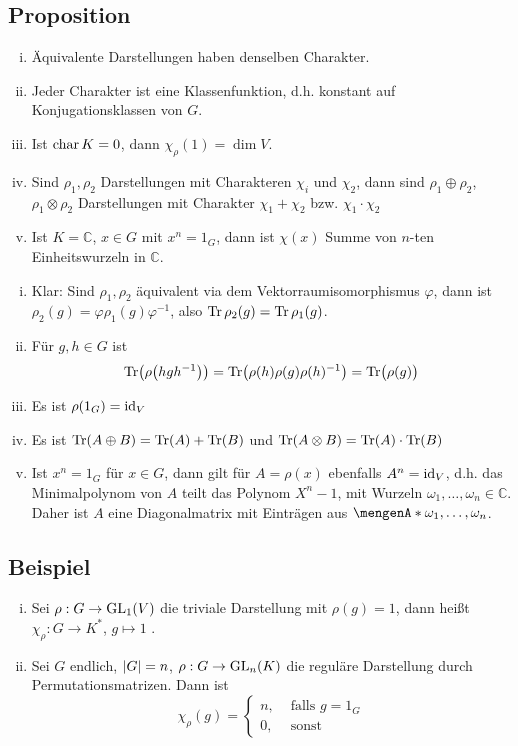 \subsection{Proposition} %
\label{sub:425}
\begin{enumerate}[(i)]
	\item Äquivalente Darstellungen haben denselben Charakter.
	\item Jeder Charakter ist eine Klassenfunktion, d.h. konstant auf Konjugationsklassen von $G$.
	\item Ist $\Char K =0$, dann $\chi_\rho(1)= \dim V$.
	\item Sind $\rho_1, \rho_2$ Darstellungen mit Charakteren $\chi_i$ und $\chi_2$, dann sind $\rho_1 \oplus \rho_2$, $\rho_1 \otimes \rho_2$ Darstellungen  mit Charakter
	$\chi_1 + \chi_2$ bzw. $\chi_1 \cdot \chi_2$
	\item Ist $K= \mathds{C}$, $x \in G$ mit $x^n= 1_G$, dann ist $\chi(x)$ Summe von $n$-ten Einheitswurzeln in $\mathds{C}$.
\end{enumerate}
\begin{enumerate}[(i)]
	\item Klar: Sind $\rho_1, \rho_2$ äquivalent via dem Vektorraumisomorphismus $\varphi$, dann ist $\rho_2(g)= \varphi \rho_1(g) \varphi ^{-1}$, also 
	$\Tr \rho_2(g) = \Tr \rho_1(g)$.
	\item Für $g,h \in G$ ist 
	\[
		\Tr \enbrace*{ \rho \enbrace*{h g h ^{-1}} } = \Tr \enbrace*{\rho(h) \rho(g) \rho(h) ^{-1}} = \Tr \enbrace[\big]{\rho(g)}   
	\]
	\item Es ist $\rho(1_G)= \id_V$
	\item Es ist $\Tr(A \oplus B)= \Tr(A) + \Tr(B)$ und $\Tr(A \otimes B)= \Tr(A) \cdot \Tr(B)$
	\item Ist $x^n = 1_G$ für $x \in G$, dann gilt für $A= \rho(x)$ ebenfalls $A^n= \id_V$, d.h. das Minimalpolynom von $A$ teilt das Polynom $X^n-1$, mit Wurzeln
	$\omega_1, \ldots , \omega_n \in \mathds{C}$. Daher ist $A$ eine Diagonalmatrix mit Einträgen aus $\set{\omega_1, \ldots , \omega_n}$. \bewende
\end{enumerate}

\subsection{Beispiel} %
\label{sub:426}
\begin{enumerate}[(i)]
	\item Sei $\rho : G \to \GL_1(V)$ die triviale Darstellung mit $\rho(g)=1$, dann heißt $\chi_\rho : G \to K^*$, $g  \mapsto 1$  .
	\item Sei $G$ endlich, $\abs*{G}=n$, $\rho : G \to \GL_n(K)$ die reguläre Darstellung durch Permutationsmatrizen. Dann ist 
	\[
		\chi_\rho(g) = \begin{cases}
			n, &\text{ falls }g= 1_G\\
			0 , &\text{ sonst}
		\end{cases}
	\]
\end{enumerate}

